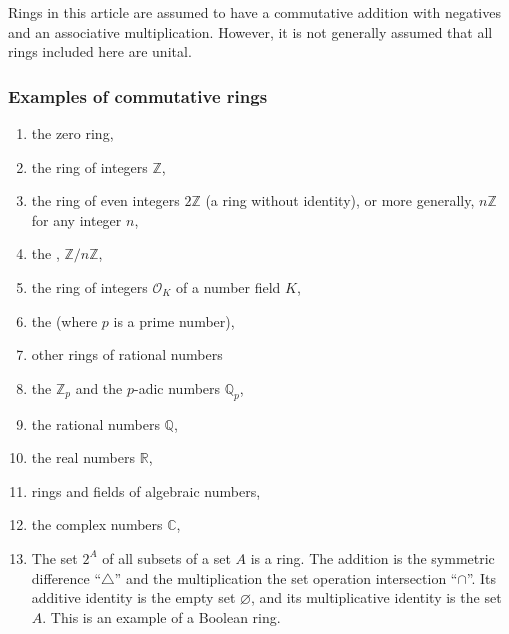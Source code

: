 \documentclass[12pt]{article}
\newcommand{\sR}[0]{\mathbb{R}}
\newcommand{\sC}[0]{\mathbb{C}}
\newcommand{\sZ}[0]{\mathbb{Z}}
\newcommand{\sQ}[0]{\mathbb{Q}}
\begin{document}
Rings in this article are assumed to have a commutative addition
with negatives and an associative multiplication.  However, it
is not generally assumed that all rings included here are unital.

\subsubsection*{Examples of commutative rings}

\begin{enumerate}
\item the zero ring,
\item the ring of integers $\sZ$,
\item the ring of even integers $2\sZ$ (a ring without identity), or more generally, $n\sZ$ for any integer $n$,
\item the , $\sZ/n\sZ$,
\item the ring of integers $\mathcal{O}_K$ of a number field $K$,
\item the  (where $p$ is a prime number),
\item other rings of rational numbers
\item the  $\sZ_p$ and the $p$-adic numbers $\sQ_p$,
\item the rational numbers $\sQ$, 
\item the real numbers $\sR$, 
\item rings and fields of algebraic numbers,
\item the complex numbers $\sC$,
\item The set $2^{A}$ of all subsets of a set $A$ is a ring.  The addition is the symmetric difference ``$\triangle$'' and the multiplication the set operation intersection ``$\cap$''.  Its additive identity is the empty set $\varnothing$, and its multiplicative identity is the set $A$.  This is an example of a Boolean ring.
\end{enumerate}
\end{document}
